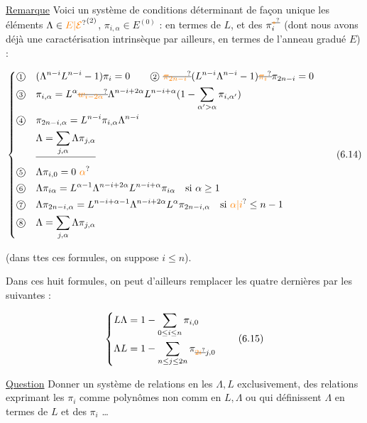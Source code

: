 \uline{Remarque} Voici un système de conditions déterminant de façon unique les éléments $\Lambda\in\unsure{E|\mathcal E}^{(2)}$, $\pi_{i,\alpha}\in E^{(0)}$ : en termes de $L$, et des $\pi_i^{\deleted{\unsure{*}}}$ (dont nous avons déjà une caractérisation intrinsèque par ailleurs, en termes de l'anneau gradué $E$) :

\[
 \left\{\begin{aligned}
 \text{\textcircled{\scriptsize 1}}\quad&(\Lambda^{n-i}L^{n-i}-1)\pi_i=0\qquad
 \text{\textcircled{\scriptsize 2}}\ \deleted{\unsure{\pi_{2n-i}}}(L^{n-i}\Lambda^{n-i}-1)\deleted{\unsure{\pi_i}}\pi_{2n-i}=0\\
 \text{\textcircled{\scriptsize 3}}\quad&\pi_{i,\alpha}=L^\alpha\deleted{\unsure{w_{i-2\alpha}}}\Lambda^{n-i+2\alpha}L^{n-i+\alpha}(1-\sum_{\alpha'>\alpha}\pi_{i,\alpha'})\\
 \text{\textcircled{\scriptsize 4}}\quad&\pi_{2n-i,\alpha}=L^{n-i}\pi_{i,\alpha}\Lambda^{n-i}\\
 &\deleted{\Lambda=\sum_{j,\alpha}\Lambda\pi_{j,\alpha}}\\
 \text{\textcircled{\scriptsize 5}}\quad&\Lambda\pi_{i,0}=0\ \unsure{\alpha}\\
 \text{\textcircled{\scriptsize 6}}\quad&\Lambda\pi_{i\alpha}=L^{\alpha-1}\Lambda^{n-i+2\alpha}L^{n-i+\alpha}\pi_{i\alpha}\quad\text{si }\alpha\ge1\\
 \text{\textcircled{\scriptsize 7}}\quad&\Lambda\pi_{2n-i,\alpha}=L^{n-i+\alpha-1}\Lambda^{n-i+2\alpha}L^\alpha\pi_{2n-i,\alpha}\quad\text{si }\unsure{\alpha|i}\le n-1\\
 \text{\textcircled{\scriptsize 8}}\quad&\Lambda=\sum_{j,\alpha}\Lambda\pi_{j,\alpha}
 \end{aligned}\right.
 \tag*{(6.14)}
\]

(dans ttes ces formules, on suppose $i\le n$).

Dans ces huit formules, on peut d'ailleurs remplacer les quatre dernières par les suivantes  :

\[
 \left\{\begin{aligned}
 L\Lambda&=1-\sum_{0\le i\le n}\pi_{i,0}\\
 \Lambda L&=1-\sum_{n\le j\le 2n}\pi_{\deleted{\unsure{2i}}j,0}
 \end{aligned}\right.
 \tag*{(6.15)}
\]

\uline{Question} Donner un système de  relations en les $\Lambda,L$ exclusivement,  des relations exprimant les $\pi_i$ comme polynômes non comm en $L,\Lambda$ ou qui définissent $\Lambda$ en termes de $L$ et des $\pi_i$ \ldots

